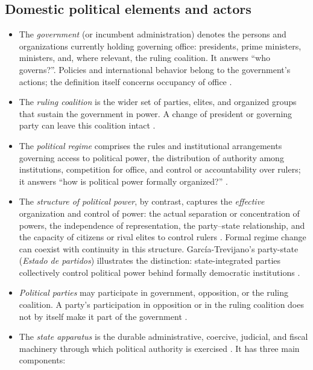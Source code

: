 \documentclass[11pt]{article}
\begin{document}
\subsection{Domestic political elements and actors}

\begin{itemize}
	\item The \emph{government} (or incumbent administration) denotes the persons and organizations currently holding governing office: presidents, prime ministers, ministers, and, where relevant, the ruling coalition. It answers ``who governs?''. Policies and international behavior belong to the government's actions; the definition itself concerns occupancy of office \parencite{linz_stepan_1996}.
	\item The \emph{ruling coalition} is the wider set of parties, elites, and organized groups that sustain the government in power. A change of president or governing party can leave this coalition intact \parencite{bueno_de_mesquita_2003}.
	\item The \emph{political regime} comprises the rules and institutional arrangements governing access to political power, the distribution of authority among institutions, competition for office, and control or accountability over rulers; it answers ``how is political power formally organized?'' \parencite{linz_stepan_1996,linz_2000}.
	\item The \emph{structure of political power}, by contrast, captures the \emph{effective} organization and control of power: the actual separation or concentration of powers, the independence of representation, the party--state relationship, and the capacity of citizens or rival elites to control rulers \parencite{garciatrevijano2010}. Formal regime change can coexist with continuity in this structure. Garc{\'i}a-Trevijano's party-state (\emph{Estado de partidos}) illustrates the distinction: state-integrated parties collectively control political power behind formally democratic institutions \parencite{garciatrevijano2010}.
	\item \emph{Political parties} may participate in government, opposition, or the ruling coalition. A party's participation in opposition or in the ruling coalition does not by itself make it part of the government \parencite{sartori_1976}.
	\item The \emph{state apparatus} is the durable administrative, coercive, judicial, and fiscal machinery through which political authority is exercised \parencite{weber1922wirtschaft,althusser_1971}. It has three main components:

\end{itemize}
\end{document}
